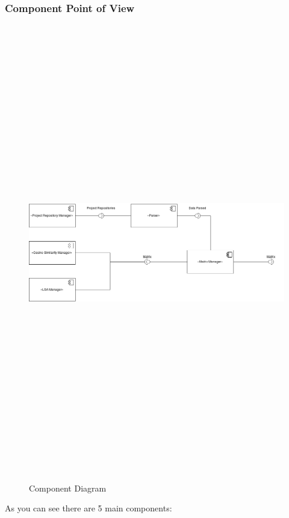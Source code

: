 \subsubsection{Component Point of View}
\begin{figure}[H]
	\includegraphics[width=15cm,height=20cm,keepaspectratio]{images/ComponentDiagram.png}
	\caption{Component Diagram}
	\label{fig:Component}
\end{figure}
As you can see there are 5 main components:
